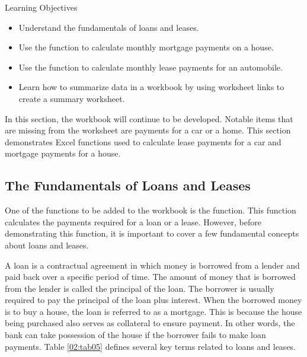 \begin{center}
	\begin{objbox}{Learning Objectives}
		\begin{itemize}
			\setlength{\itemsep}{0pt}
			\setlength{\parskip}{0pt}
			\setlength{\parsep}{0pt}
			
			\item Understand the fundamentals of loans and leases.
			\item Use the  function to calculate monthly mortgage payments on a house.
			\item Use the  function to calculate monthly lease payments for an automobile.
			\item Learn how to summarize data in a workbook by using worksheet links to create a summary worksheet.

		\end{itemize}
	\end{objbox}
\end{center}

In this section, the  workbook will continue to be developed. Notable items that are missing from the  worksheet are payments for a car or a home. This section demonstrates Excel functions used to calculate lease payments for a car and mortgage payments for a house.

\subsection{The Fundamentals of Loans and Leases}

One of the functions to be added to the  workbook is the  function. This function calculates the payments required for a loan or a lease. However, before demonstrating this function, it is important to cover a few fundamental concepts about loans and leases.

A loan is a contractual agreement in which money is borrowed from a lender and paid back over a specific period of time. The amount of money that is borrowed from the lender is called the principal of the loan. The borrower is usually required to pay the principal of the loan plus interest. When the borrowed money is to buy a house, the loan is referred to as a mortgage. This is because the house being purchased also serves as collateral to ensure payment. In other words, the bank can take possession of the house if the borrower fails to make loan payments. Table \ref{02:tab05} defines several key terms related to loans and leases.


